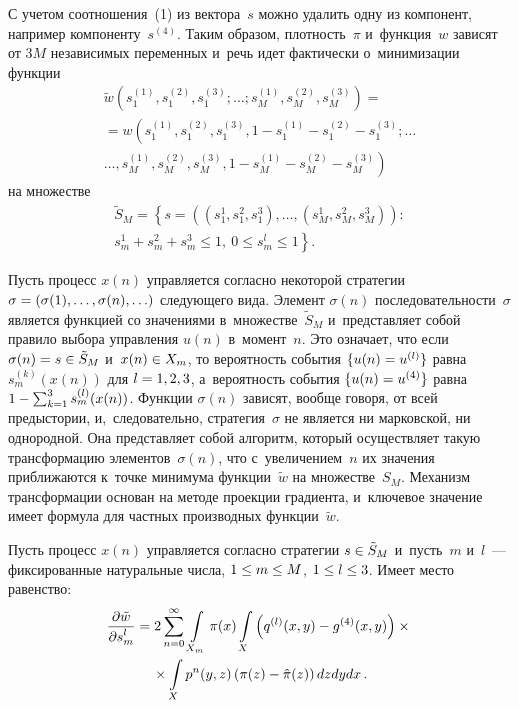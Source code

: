 \begin{multicols}{2}
  С учетом соотношения~(1) из вектора~$s$   мож\-но удалить одну из компонент, 
например компоненту~$s^{(4)}$. Таким образом, плот\-ность~$\pi$ 
и~функция~$w$ зависят от $3M$ независимых переменных и~речь идет 
фактически о~минимизации функции
  \begin{multline*}
  \tilde{w}\left( s_1^{(1)}, s_1^{(2)}, s_1^{(3)}; \ldots ; s_M^{(1)}, s_M^{(2)}, 
s_M^{(3)}\right)={}\\
  {}= w\left( s_1^{(1)}, s_1^{(2)}, s_1^{(3)}, 1-s_1^{(1)}-s_1^{(2)}-s_1^{(3)}; 
\ldots \right.\\
\left.\ldots , s_M^{(1)}, s_M^{(2)}, s_M^{(3)}, 1-s_M^{(1)}-s_M^{(2)}- 
s_M^{(3)}\right)
  \end{multline*}
на множестве
\begin{multline*}
\tilde{S}_M= \left\{ s=\left( \left( s_1^1,s_1^2,s_1^3\right), \ldots , \left( s_M^1, 
s_M^2, s_M^3\right)\right):\right.\\ 
\left.s_m^1+s_m^2+s_m^3\leq 1,\ 0\leq s_m^l \leq 
1\right\}.
\end{multline*}
  
  Пусть процесс $x(n)$ управ\-ля\-ет\-ся согласно некоторой стратегии 
$\sigma\hm= \left( \sigma(1), \ldots , \sigma(n), \ldots \right)$ сле\-ду\-юще\-го вида. 
Элемент $\sigma(n)$ по\-сле\-до\-ва\-тель\-ности~$\sigma$ является функцией со 
значениями в~множестве~$\tilde{S}_M$ и~\mbox{пред\-став\-ля\-ет} собой правило 
выбора управ\-ле\-ния $u(n)$ в~момент~$n$. Это означает, что если 
$\sigma(n)\hm= s\hm\in \tilde{S}_M$ и~$x(n)\hm\in X_m$, то вероятность 
события $\{ u(n)\hm= u^{(l)}\}$ равна~$s_m^{(k)}(x(n))$ для $l\hm= 1,2,3$, 
а~вероятность события $\{ u(n)\hm= u^{(4)}\}$ равна $1\hm- 
\sum\nolimits^3_{k=1} s_m^{(l)}(x(n))$. Функции $\sigma(n)$ зависят, вообще 
говоря, от всей предыс\-то\-рии, и,~следовательно, стратегия~$\sigma$ не 
является ни марковской, ни однородной. Она пред\-став\-ля\-ет собой алгоритм, 
который осуществляет такую трансформацию элементов~$\sigma(n)$, что 
с~увеличением~$n$ их значения приближаются к~точ\-ке минимума 
функции~$\tilde{w}$ на множестве~$S_M$. Механизм трансформации 
основан на методе проекции градиента, и~ключевое значение имеет формула 
для част\-ных производных функции~$\tilde{w}$. 
  
  Пусть процесс $x(n)$ управ\-ля\-ет\-ся согласно стратегии $s\hm\in 
\tilde{S}_M$ и~пусть~$m$ и~$l$~--- фиксированные натуральные чис\-ла, 
$1\hm\leq m\hm\leq M$, $1\hm\leq l\hm\leq 3$. Имеет место равенство:
  \begin{multline}
  \displaystyle\frac{\displaystyle \partial \tilde{w}\mathstrut}{\displaystyle \partial s_m^l\mathstrut} =2\sum\limits^\infty_{n=0} 
\int\limits_{\,X_m} \pi(x)\int\limits_X \left( q^{(l)}(x,y) -g^{(4)} (x,y)\right)\times{}\\
{}\times \int\limits_X 
p^n(y,z)\left( \pi(z)- \hat{\pi}(z)\right) dzdydx\,.
  \label{e2-kraz}
  \end{multline}


\end{multicols}
